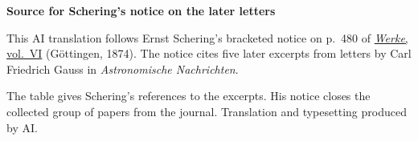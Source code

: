 \clearpage\thispagestyle{empty}
\begin{center}\textbf{Source for Schering’s notice on the later letters}\end{center}
\noindent This AI translation follows Ernst Schering’s bracketed notice on p.~480 of \href{https://gdz.sub.uni-goettingen.de/id/PPN236007467}{\textit{Werke}, vol.~VI} (Göttingen, 1874). The notice cites five later excerpts from letters by Carl Friedrich Gauss in \textit{Astronomische Nachrichten}.
\par\smallskip\noindent The table gives Schering’s references to the excerpts. His notice closes the collected group of papers from the journal. Translation and typesetting produced by AI.
\clearpage
